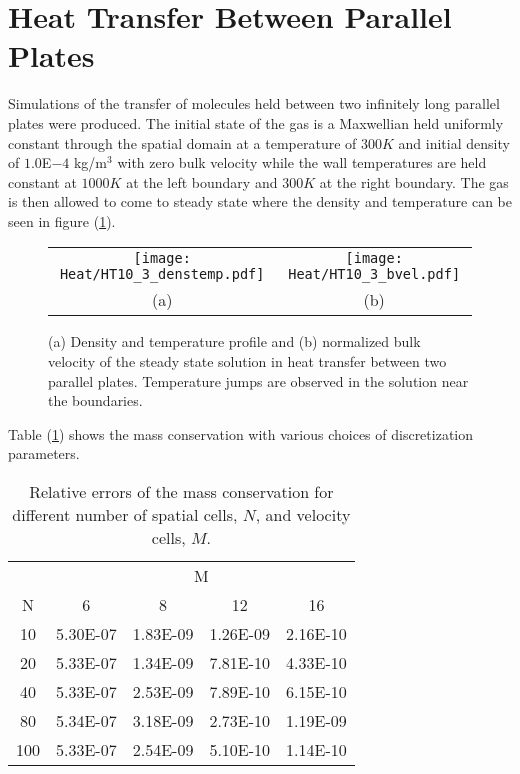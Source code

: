 \section{Heat Transfer Between Parallel Plates}
Simulations of the transfer of molecules held between two infinitely long parallel plates were produced. The initial state of the gas is a Maxwellian held uniformly constant through the spatial domain at a temperature of $300K$ and initial density of $1.0$E$-4$ kg/m${}^3$ with zero bulk velocity while the wall temperatures are held constant at $1000K$ at the left boundary and $300K$ at the right boundary. The gas is then allowed to come to steady state where the density and temperature can be seen in figure (\ref{figX1}).
%
\begin{figure}[h]
\centering
  \begin{tabular}{cc}
  \texttt{[image: Heat/HT10\_3\_denstemp.pdf]}&
  \texttt{[image: Heat/HT10\_3\_bvel.pdf]}\\
  {\small (a) }& {\small (b) } 
  \end{tabular}
  \caption{\label{figX1} (a) Density and temperature profile and (b) normalized bulk velocity of the steady state solution in heat transfer between two parallel plates. Temperature jumps are observed in the solution near the boundaries.}
\end{figure}
\FloatBarrier
%
%
Table (\ref{ErrorMass}) shows the mass conservation with various choices of discretization parameters.
%
\begin{table}[!htb]
\centering
\begin{tabular}{|c|cccc|}
\hline
&\multicolumn{4}{c|}{M} \\
N & 6 & 8 & 12 & 16\\ \hline
10 & 5.30E-07 & 1.83E-09 & 1.26E-09 & 2.16E-10\\
20 & 5.33E-07 & 1.34E-09 & 7.81E-10 & 4.33E-10\\
40 & 5.33E-07 & 2.53E-09 & 7.89E-10 & 6.15E-10\\
80 & 5.34E-07 & 3.18E-09 & 2.73E-10 & 1.19E-09\\
100 & 5.33E-07 & 2.54E-09 &  5.10E-10 & 1.14E-10\\ \hline
\end{tabular}
\vspace*{5mm}
\caption{\label{ErrorMass} Relative errors of the mass conservation for different number of 
spatial cells, $N$, and velocity cells, $M$.}
\end{table}
